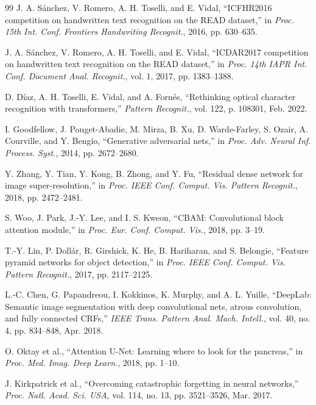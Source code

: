\documentclass[journal]{IEEEtran}
\begin{document}
\begin{thebibliography}{99}
J. A. Sánchez, V. Romero, A. H. Toselli, and E. Vidal, ``ICFHR2016 competition on handwritten text recognition on the READ dataset,'' in \textit{Proc. 15th Int. Conf. Frontiers Handwriting Recognit.}, 2016, pp. 630--635.

J. A. Sánchez, V. Romero, A. H. Toselli, and E. Vidal, ``ICDAR2017 competition on handwritten text recognition on the READ dataset,'' in \textit{Proc. 14th IAPR Int. Conf. Document Anal. Recognit.}, vol. 1, 2017, pp. 1383--1388.

D. Díaz, A. H. Toselli, E. Vidal, and A. Fornés, ``Rethinking optical character recognition with transformers,'' \textit{Pattern Recognit.}, vol. 122, p. 108301, Feb. 2022.

I. Goodfellow, J. Pouget-Abadie, M. Mirza, B. Xu, D. Warde-Farley, S. Ozair, A. Courville, and Y. Bengio, ``Generative adversarial nets,'' in \textit{Proc. Adv. Neural Inf. Process. Syst.}, 2014, pp. 2672--2680.

Y. Zhang, Y. Tian, Y. Kong, B. Zhong, and Y. Fu, ``Residual dense network for image super-resolution,'' in \textit{Proc. IEEE Conf. Comput. Vis. Pattern Recognit.}, 2018, pp. 2472--2481.

S. Woo, J. Park, J.-Y. Lee, and I. S. Kweon, ``CBAM: Convolutional block attention module,'' in \textit{Proc. Eur. Conf. Comput. Vis.}, 2018, pp. 3--19.

T.-Y. Lin, P. Dollár, R. Girshick, K. He, B. Hariharan, and S. Belongie, ``Feature pyramid networks for object detection,'' in \textit{Proc. IEEE Conf. Comput. Vis. Pattern Recognit.}, 2017, pp. 2117--2125.

L.-C. Chen, G. Papandreou, I. Kokkinos, K. Murphy, and A. L. Yuille, ``DeepLab: Semantic image segmentation with deep convolutional nets, atrous convolution, and fully connected CRFs,'' \textit{IEEE Trans. Pattern Anal. Mach. Intell.}, vol. 40, no. 4, pp. 834--848, Apr. 2018.

O. Oktay et al., ``Attention U-Net: Learning where to look for the pancreas,'' in \textit{Proc. Med. Imag. Deep Learn.}, 2018, pp. 1--10.

J. Kirkpatrick et al., ``Overcoming catastrophic forgetting in neural networks,'' \textit{Proc. Natl. Acad. Sci. USA}, vol. 114, no. 13, pp. 3521--3526, Mar. 2017.


\end{thebibliography}
\end{document}
